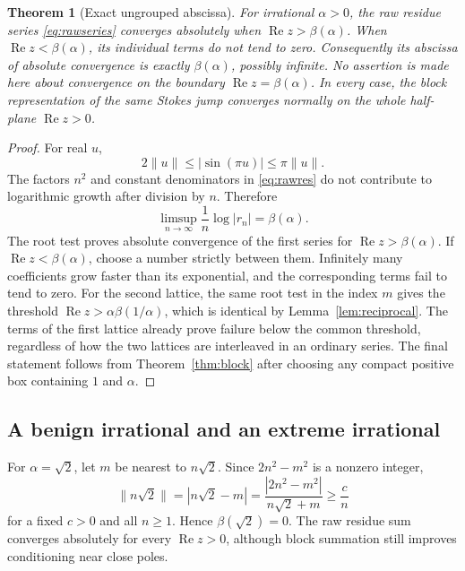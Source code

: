 \documentclass[11pt,a4paper]{article}
\numberwithin{equation}{section}
\newtheorem{theorem}{Theorem}[section]
\theoremstyle{definition}
\theoremstyle{remark}
\newcommand{\re}{\operatorname{Re}}
\begin{document}
\begin{theorem}[Exact ungrouped abscissa]
\label{thm:arithmetic}
For irrational $\alpha>0$, the raw residue series
\eqref{eq:rawseries} converges absolutely when $\re z>\beta(\alpha)$.
When $\re z<\beta(\alpha)$, its individual terms do not tend to zero.
Consequently its abscissa of absolute convergence is exactly
$\beta(\alpha)$, possibly infinite. No assertion is made here about
convergence on the boundary $\re z=\beta(\alpha)$.
In every case, the block representation of the same Stokes jump converges
normally on the whole half-plane $\re z>0$.
\end{theorem}
\begin{proof}
For real $u$,
\[
 2\|u\|\le|\sin(\pi u)|\le\pi\|u\|.
\]
The factors $n^2$ and constant denominators in \eqref{eq:rawres} do not
contribute to logarithmic growth after division by $n$. Therefore
\[
 \limsup_{n\to\infty}\frac1n\log|r_n|=\beta(\alpha).
\]
The root test proves absolute convergence of the first series for
$\re z>\beta(\alpha)$. If $\re z<\beta(\alpha)$, choose a number
strictly between them. Infinitely many coefficients grow faster than its
exponential, and the corresponding terms fail to tend to zero.
For the second lattice, the same root test in the index $m$ gives the
threshold $\re z>\alpha\beta(1/\alpha)$, which is identical by
Lemma~\ref{lem:reciprocal}. The terms of the first lattice already prove
failure below the common threshold, regardless of how the two lattices
are interleaved in an ordinary series. The final statement follows from
Theorem~\ref{thm:block} after choosing any compact positive box containing
$1$ and $\alpha$.
\end{proof}

\subsection{A benign irrational and an extreme irrational}
For $\alpha=\sqrt2$, let $m$ be nearest to $n\sqrt2$. Since
$2n^2-m^2$ is a nonzero integer,
\[
 \|n\sqrt2\|=|n\sqrt2-m|
 =\frac{|2n^2-m^2|}{n\sqrt2+m}\ge\frac c n
\]
for a fixed $c>0$ and all $n\ge1$. Hence $\beta(\sqrt2)=0$. The raw
residue sum converges absolutely for every $\re z>0$, although block
summation still improves conditioning near close poles.
\end{document}
